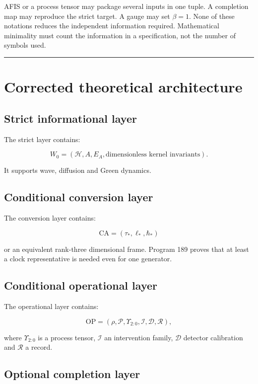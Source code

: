 \documentclass[11pt,a4paper,openany]{report}
\begin{document}
AFIS or a process tensor may package several inputs in one tuple. A completion map may reproduce the strict target. A gauge may set \(\beta=1\). None of these notations reduces the independent information required. Mathematical minimality must count the information in a specification, not the number of symbols used.

\par\medskip\hrule\medskip

\chapter{Corrected theoretical architecture}

\section{Strict informational layer}

The strict layer contains:

\[
W_0=(\mathcal H,A,E_A,\text{dimensionless kernel invariants}).
\]

It supports wave, diffusion and Green dynamics.

\section{Conditional conversion layer}

The conversion layer contains:

\[
\mathrm{CA}
=
(\tau_\ast,\ell_\ast,\hbar_\ast)
\]

or an equivalent rank-three dimensional frame. Program 189 proves that at least a clock representative is needed even for one generator.

\section{Conditional operational layer}

The operational layer contains:

\[
\mathrm{OP}
=
(\rho,\mathcal P,\Upsilon_{2:0},
\mathcal I,\mathcal D,\mathcal R),
\]

where \(\Upsilon_{2:0}\) is a process tensor, \(\mathcal I\) an intervention family, \(\mathcal D\) detector calibration and \(\mathcal R\) a record.

\section{Optional completion layer}
\end{document}
